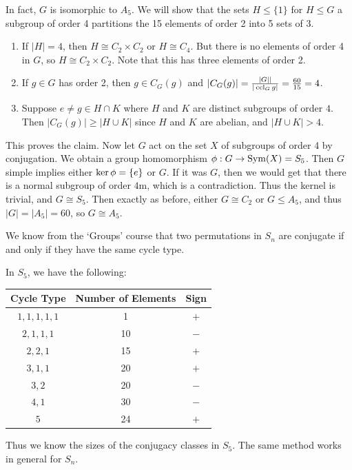 \documentclass[a4paper]{scrartcl}
\begin{document}
\begin{example}
In fact, $G$ is isomorphic to $A_5$. We will show that the sets $H \leq \{1\}$ for $H \leq G$ a subgroup of order 4 partitions the 15 elements of order 2 into 5 sets of 3. 
\begin{enumerate}
	\item If $|H| = 4$, then $H \cong C_2 \times C_2$ or $H \cong C_4$. But there is no elements of order 4 in $G$, so $H \cong C_2 \times C_2$. Note that this has three elements of order 2.
	\item If $g \in G$ has order 2, then $g \in C_G(g)$ and $|C_G(g)| = \frac{|G||}{|\operatorname{ccl}_G{g}|} = \frac{60}{15} = 4$.
	\item Suppose $e \neq g \in H \cap K$ where $H$ and $K$ are distinct subgroups of order $4$. Then $|C_G(g)| \geq |H \cup K|$ since $H$ and $K$ are abelian, and $|H \cup K| > 4$.
\end{enumerate}
This proves the claim. Now let $G$ act on the set $X$ of subgroups of order 4 by conjugation. We obtain a group homomorphism $\phi:G \rightarrow \operatorname{Sym}(X) = S_5$. Then $G$ simple implies either $\operatorname{ker} \phi = \{e\}$ or $G$. If it was $G$, then we would get that there is a normal subgroup of order $4$m, which is a contradiction. Thus the kernel is trivial, and $G \cong S_5$. Then exactly as before, either $G \cong C_2$ or $G \leq A_5$, and thus $|G| = |A_5| = 60$, so $G \cong A_5$.  
\end{example}


We know from the `Groups' course that two permutations in $S_n$ are conjugate if and only if they have the same cycle type.

\begin{example}
	In $S_5$, we have the following:
	\begin{center}
		\begin{tabular}{@{}ccc@{}}
			\toprule
			Cycle Type    & Number of Elements & Sign \\ \midrule
			$1, 1, 1, 1, 1$  & 1   &   $+$  \\ 
			$2, 1, 1, 1$  & 10   &   $-$  \\
			$2, 2, 1$  & 15   &   $+$  \\
			$3, 1, 1$  & 20   &   $+$  \\
			$3, 2$  & 20   &   $-$  \\
			$4, 1$  & 30   &   $-$  \\
			$5$  & 24   &   $+$  \\
			\bottomrule
			\end{tabular}
	\end{center}
	Thus we know the sizes of the conjugacy classes in $S_5$. The same method works in general for $S_n$.
\end{example}
\end{document}
